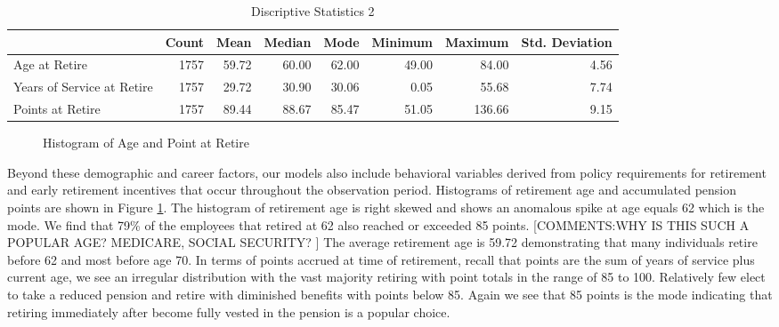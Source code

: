 \documentclass[12pt,letterpaper]{article}
\begin{document}
\begin{table}[htbp]
	\centering
	\scriptsize
	\caption{Discriptive Statistics 2}
	\begin{tabular}{lrrrrrrr}
		\toprule
		& Count & Mean  & Median & Mode  & Minimum & Maximum & Std. Deviation \\
		\midrule
		\multicolumn{1}{l}{Age at Retire} & 1757  & 59.72 & 60.00 & 62.00 & 49.00 & 84.00 & 4.56 \\
		\multicolumn{1}{l}{Years of Service at Retire} & 1757  & 29.72 & 30.90 & 30.06 & 0.05  & 55.68 & 7.74 \\
		\multicolumn{1}{l}{Points at Retire} & 1757  & 89.44 & 88.67 & 85.47 & 51.05 & 136.66 & 9.15 \\
		\bottomrule
	\end{tabular}%
	\label{tab:descrip2}%
\end{table}%

\begin{figure}[h!]
	\centering
	\caption{Histogram of Age and Point at Retire}
	\label{fig:hist}
\end{figure}

Beyond these demographic and career factors, our models also include behavioral variables derived from policy requirements for retirement and early retirement incentives that occur throughout the observation period. Histograms of retirement age and accumulated pension points are shown in Figure \ref{fig:hist}. The histogram of retirement age is right skewed and shows an anomalous spike at age equals 62 which is the mode.  We find that 79\% of the employees that retired at 62 also reached or exceeded 85 points.
[COMMENTS:WHY IS THIS SUCH A POPULAR AGE?  MEDICARE, SOCIAL SECURITY? ]
The average retirement age is 59.72 demonstrating that many individuals retire before 62 and most before age 70. In terms of points accrued at time of retirement, recall that points are the sum of years of service plus current age, we see an irregular distribution with the vast majority retiring with point totals in the range of 85 to 100. Relatively few elect to take a reduced pension and retire with diminished benefits with points below 85. Again we see that 85 points is the mode indicating that retiring immediately after become fully vested in the pension is a popular choice.
\end{document}
